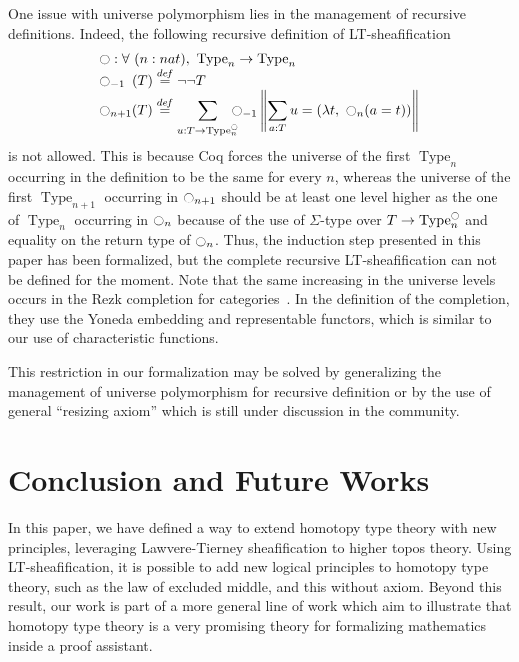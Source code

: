 \documentclass[preprint,9pt,numbers]{sigplanconf}
\newcommand \defeq {\overset{de\hspace{-0.2ex}f}{=}}
\newcommand{\mynote}[2]{
    \fbox{\bfseries\sffamily\scriptsize#1}
    {\small$\blacktriangleright$\textsf{\emph{#2}}$\blacktriangleleft$}~}
\newcommand\nt[1]{\mynote{NT}{#1}}
\DeclareMathOperator{\Type}{Type}
\newcommand{\modal}{\ensuremath{\ocircle}}
\begin{document}
One issue with universe polymorphism lies in the management of
recursive definitions. Indeed, the following recursive definition of
LT-sheafification
%
\vspace{-0.05em}
\[ \begin{array}{l}
   \modal : \forall \ (n : nat), \ \Type_n \to \Type_n 
   \\
    \modal_{-1\phantom{n}}(T) \defeq\lnot\lnot T \\

      \displaystyle{\modal_{n+1}(T)} \defeq  
      \displaystyle{\sum_{u:T \to \Type_n^\modal} \!\!\!\!\modal_{-1} 
      \left\|
      \sum_{a:T} u= (\lambda t,~\modal_n (a=t))
      \right\|}
    \end{array}
\vspace{-0.3em}
\]
%
is not allowed. 
%
This is because Coq forces the universe of the first $\Type_n$
occurring in the definition to be the same for every $n$, whereas the
universe of the first $\Type_{n+1}$ occurring in $\modal_{n+1}$ should be at
least one level higher as the one of $\Type_n$ occurring in
$\modal_{n}$ because of the use of $\Sigma$-type over
$T \to \Type_n^\modal$ and equality on the return type of $\modal_n$.
%
%
Thus, the induction step presented in this paper has been formalized,
but the complete recursive LT-sheafification can not be defined for the
moment.
%
Note that the same increasing in the universe levels occurs in the
Rezk completion for categories~\cite{rezk}. In the definition of the
completion, they use the Yoneda embedding and representable functors,
which is similar to our use of characteristic functions.
 
%
This restriction in our formalization may be solved by
generalizing the management of universe polymorphism for recursive definition
%
or by the use of general ``resizing axiom'' which is still under
discussion in the community.

\section{Conclusion and Future Works}
\label{sec:future-works}

In this paper, we have defined a way to extend homotopy type theory
with new principles, leveraging Lawvere-Tierney sheafification to
higher topos theory. 
%
Using LT-sheafification, it is possible to add new logical principles to
homotopy type theory, such as the law of excluded middle, and this
without axiom.
%
Beyond this result, our work is part of a more general line of work
which aim to illustrate that homotopy type theory is a very promising
theory for formalizing mathematics inside a proof assistant.
\end{document}
